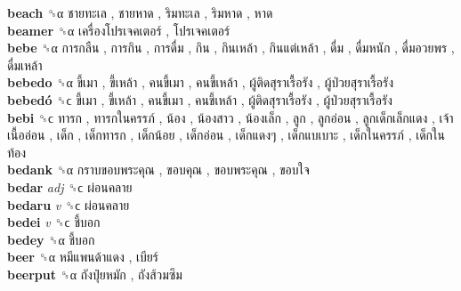 \textbf{beach} ␝α   ชายทะเล ,  ชายหาด ,  ริมทะเล ,  ริมหาด ,  หาด   \\
\textbf{beamer} ␝α   เครื่องโปรเจคเตอร์ ,  โปรเจคเตอร์   \\
\textbf{bebe} ␝α   การกลืน ,  การกิน ,  การดื่ม ,  กิน ,  กินเหล้า ,  กินแต่เหล้า ,  ดื่ม ,  ดื่มหนัก ,  ดื่มอวยพร ,  ดื่มเหล้า   \\
\textbf{bebedo} ␝α   ขี้เมา ,  ขี้เหล้า ,  คนขี้เมา ,  คนขี้เหล้า ,  ผู้ติดสุราเรื้อรัง ,  ผู้ป่วยสุราเรื้อรัง   \\
\textbf{bebedó} ␝ϲ   ขี้เมา ,  ขี้เหล้า ,  คนขี้เมา ,  คนขี้เหล้า ,  ผู้ติดสุราเรื้อรัง ,  ผู้ป่วยสุราเรื้อรัง   \\
\textbf{bebi} ␝ϲ   ทารก ,  ทารกในครรภ์ ,  น้อง ,  น้องสาว ,  น้องเล็ก ,  ลูก ,  ลูกอ่อน ,  ลูกเด็กเล็กแดง ,  เจ้าเนื้ออ่อน ,  เด็ก ,  เด็กทารก ,  เด็กน้อย ,  เด็กอ่อน ,  เด็กแดงๆ ,  เด็กแบเบาะ ,  เด็กในครรภ์ ,  เด็กในท้อง   \\
\textbf{bedank} ␝α   กราบขอบพระคุณ ,  ขอบคุณ ,  ขอบพระคุณ ,  ขอบใจ   \\
\textbf{bedar} \emph{adj}  ␝ϲ   ผ่อนคลาย   \\
\textbf{bedaru} \emph{v}  ␝ϲ   ผ่อนคลาย   \\
\textbf{bedei} \emph{v}  ␝ϲ   ชี้บอก   \\
\textbf{bedey} ␝α   ชี้บอก   \\
\textbf{beer} ␝α   หมีแพนด้าแดง ,  เบียร์   \\
\textbf{beerput} ␝α   ถังปุ๋ยหมัก ,  ถังส้วมซึม   \\
